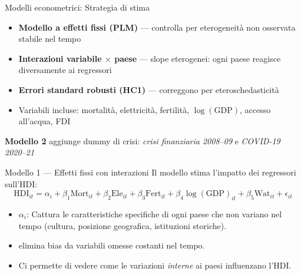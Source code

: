\documentclass[
  ignorenonframetext,
  aspectratio=43,
]{beamer}
\begin{document}
\begin{frame}{Modelli econometrici: Strategia di stima}
\protect{}\label{modelli-econometrici-strategia-di-stima}
\begin{itemize}
  \item \textbf{Modello a effetti fissi (PLM)} — controlla per eterogeneità non osservata stabile nel tempo
  \item \textbf{Interazioni variabile $\times$ paese} — slope eterogenei: ogni paese reagisce diversamente ai regressori
  \item \textbf{Errori standard robusti (HC1)} — correggono per eteroschedasticità
  \item Variabili incluse: mortalità, elettricità, fertilità, $\log(\text{GDP})$, accesso all'acqua, FDI
\end{itemize}

\vspace{0.4em}

\textbf{Modello 2} aggiunge dummy di crisi:
\textit{crisi finanziaria 2008--09} e \textit{COVID-19 2020--21}
\end{frame}

\begin{frame}{Modello 1 --- Effetti fissi con interazioni}
\protect{}\label{modello-1-effetti-fissi-con-interazioni}
Il modello stima l'impatto dei regressori sull'HDI: \[
\text{HDI}_{it} = \alpha_i + \beta_1 \text{Mort}_{it} + \beta_2 \text{Ele}_{it} + \beta_3 \text{Fert}_{it} + \beta_4 \log(\text{GDP})_{it} + \beta_5 \text{Wat}_{it} + \epsilon_{it}
\]

\begin{itemize}
  \item $\alpha_i$: Cattura le caratteristiche specifiche di ogni paese che non variano nel tempo (cultura, posizione geografica, istituzioni storiche).
  \item elimina bias da variabili omesse costanti nel tempo.
  \item Ci permette di vedere come le variazioni \textit{interne} ai paesi influenzano l'HDI.
\end{itemize}
\end{frame}
\end{document}
